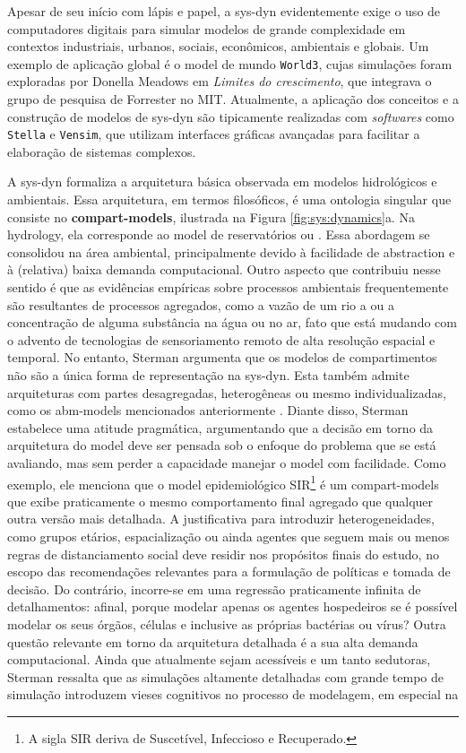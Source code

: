 \documentclass[./main.tex]{subfiles}
\begin{document}
\noindent Apesar de seu início com lápis e papel, a \gls{sys-dyn} evidentemente exige o uso de computadores digitais para simular modelos de grande complexidade em contextos industriais, urbanos, sociais, econômicos, ambientais e globais. Um exemplo de aplicação global é o \gls{model} de mundo \texttt{World3}, cujas simulações foram exploradas por Donella Meadows em \textit{Limites do crescimento}, que integrava o grupo de pesquisa de Forrester no MIT. Atualmente, a aplicação dos conceitos e a construção de modelos de \gls{sys-dyn} são tipicamente realizadas com \textit{softwares} como \texttt{Stella} e \texttt{Vensim}, que utilizam interfaces gráficas avançadas para facilitar a elaboração de sistemas complexos.

\par A \gls{sys-dyn} formaliza a arquitetura básica observada em modelos hidrológicos e ambientais. Essa arquitetura, em termos filosóficos, é uma ontologia singular que consiste no \textbf{\gls{compart-models}}, ilustrada na Figura \ref{fig:sys:dynamics}a. Na \gls{hydrology}, ela corresponde ao \gls{model} de reservatórios ou . Essa abordagem se consolidou na área ambiental, principalmente devido à facilidade de \gls{abstraction} e à (relativa) baixa demanda computacional. Outro aspecto que contribuiu nesse sentido é que as evidências empíricas sobre processos ambientais frequentemente são resultantes de processos agregados, como a vazão de um rio a ou a concentração de alguma substância na água ou no ar, fato que está mudando com o advento de tecnologias de sensoriamento remoto de alta resolução espacial e temporal. No entanto, Sterman argumenta que os modelos de compartimentos não são a única forma de representação na \gls{sys-dyn}. Esta também admite arquiteturas com partes desagregadas, heterogêneas ou mesmo individualizadas, como os \gls{abm-models} mencionados anteriormente \cite{sterman2018}. Diante disso, Sterman estabelece uma atitude pragmática, argumentando que a decisão em torno da arquitetura do \gls{model} deve ser pensada sob o enfoque do problema que se está avaliando, mas sem perder a capacidade manejar o \gls{model} com facilidade. Como exemplo, ele menciona que o \gls{model} epidemiológico SIR\footnote{A sigla SIR deriva de Suscetível, Infeccioso e Recuperado.} é um \gls{compart-models} que exibe praticamente o mesmo comportamento final agregado que qualquer outra versão mais detalhada. A justificativa para introduzir heterogeneidades, como grupos etários, espacialização ou ainda agentes que seguem mais ou menos regras de distanciamento social deve residir nos propósitos finais do estudo, no escopo das recomendações relevantes para a formulação de políticas e tomada de decisão. Do contrário, incorre-se em uma regressão praticamente infinita de detalhamentos: afinal, porque modelar apenas os agentes hospedeiros se é possível modelar os seus órgãos, células e inclusive as próprias bactérias ou vírus? Outra questão relevante em torno da arquitetura detalhada é a sua alta demanda computacional. Ainda que atualmente sejam acessíveis e um tanto sedutoras, Sterman ressalta que as simulações altamente detalhadas com grande tempo de simulação introduzem vieses cognitivos no processo de modelagem, em especial na 
\end{document}
